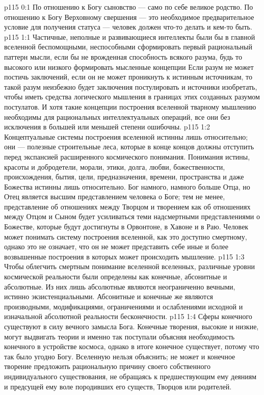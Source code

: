\vs p115 0:1 По отношению к Богу сыновство --- само по себе великое родство. По отношению к Богу Верховному свершения --- это необходимое предварительное условие для получения статуса --- человек должен что\hyp{}то делать и кем\hyp{}то быть.
\vs p115 1:1 Частичные, неполные и развивающиеся интеллекты были бы в главной вселенной беспомощными, неспособными сформировать первый рациональный паттерн мысли, если бы не врожденная способность всякого разума, будь то высокого или низкого формировать мысленные концепции  Если разум не может постичь заключений, если он не может проникнуть к истинным источникам, то такой разум неизбежно будет заключения постулировать и источники изобретать, чтобы иметь средства логического мышления в границах этих созданных разумом постулатов. И хотя такие концепции построения вселенной тварному мышлению необходимы для рациональных интеллектуальных операций, все они без исключения в большей или меньшей степени ошибочны.
\vs p115 1:2 Концептуальные системы построения вселенной истинны лишь относительно; они --- полезные строительные леса, которые в конце концов должны отступить перед экспансией расширенного космического понимания. Понимания истины, красоты и добродетели, морали, этики, долга, любви, божественности, происхождения, бытия, цели, предназначения, времени, пространства и даже Божества истинны лишь относительно. Бог намного, намного больше Отца, но Отец является высшим представлением человека о Боге; тем не менее, представление об отношениях между Творцом и творением как об отношениях между Отцом и Сыном будет усиливаться теми надсмертными представлениями о Божестве, которые будут достигнуты в Орвонтоне, в Хавоне и в Раю. Человек может понимать систему построения вселенной, как это доступно смертному, однако это не означает, что он не может представить себе иные и более возвышенные построения в которых может происходить мышление.
\vs p115 1:3 Чтобы облегчить смертным понимание вселенной вселенных, различные уровни космической реальности были определены как конечные, абсонитные и абсолютные. Из них лишь абсолютные являются неограниченно вечными, истинно экзистенциальными. Абсонитные и конечные же являются производными, модификациями, ограничениями и ослаблениями исходной и изначальной абсолютной реальности бесконечности.
\vs p115 1:4 Сферы конечного существуют в силу вечного замысла Бога. Конечные творения, высокие и низкие, могут выдвигать теории и именно так поступали объясняя необходимость конечного в устройстве космоса, однако в итоге конечное существует, потому что так было угодно Богу. Вселенную нельзя объяснить; не может и конечное творение предложить рациональную причину своего собственного индивидуального существования, не обращаясь к предшествующим ему деяниям и предсущей ему воле породивших его существ, Творцов или родителей.
